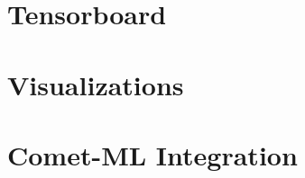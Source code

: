 \documentclass[../../fyp.tex]{subfiles}
\begin{document}
 \label{chap:evaluation_methods}
\section{Tensorboard}


\section{Visualizations}


\section{Comet-ML Integration}


\end{document}
